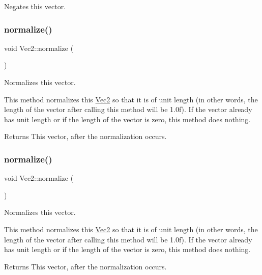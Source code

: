 Negates this vector. \mbox{\label{classVec2_aa0b240c09b19c98d2d2fe462aca478cd}} 
\subsubsection{\texorpdfstring{normalize()}{normalize()}\hspace{0.1cm}{\footnotesize\ttfamily [1/2]}}
{\footnotesize\ttfamily void Vec2\+::normalize (\begin{DoxyParamCaption}{ }\end{DoxyParamCaption})}

Normalizes this vector.

This method normalizes this \hyperlink{classVec2}{Vec2} so that it is of unit length (in other words, the length of the vector after calling this method will be 1.\+0f). If the vector already has unit length or if the length of the vector is zero, this method does nothing.

\begin{DoxyReturn}{Returns}
This vector, after the normalization occurs. 
\end{DoxyReturn}
\mbox{\label{classVec2_aa0b240c09b19c98d2d2fe462aca478cd}} 
\subsubsection{\texorpdfstring{normalize()}{normalize()}\hspace{0.1cm}{\footnotesize\ttfamily [2/2]}}
{\footnotesize\ttfamily void Vec2\+::normalize (\begin{DoxyParamCaption}{ }\end{DoxyParamCaption})}

Normalizes this vector.

This method normalizes this \hyperlink{classVec2}{Vec2} so that it is of unit length (in other words, the length of the vector after calling this method will be 1.\+0f). If the vector already has unit length or if the length of the vector is zero, this method does nothing.

\begin{DoxyReturn}{Returns}
This vector, after the normalization occurs. 
\end{DoxyReturn}
\mbox{\label{classVec2_a7d0cfd297b55abcb15ff1137cde32edd}} 
